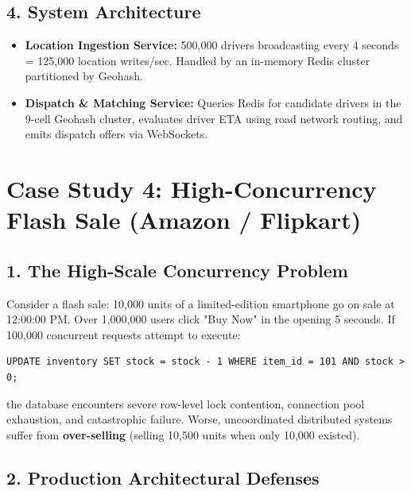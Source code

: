 \documentclass[10pt,journal,compsoc,onecolumn]{IEEEtran}
\begin{document}
\subsection{4. System Architecture}
\begin{itemize}
    \item \textbf{Location Ingestion Service:} 500,000 drivers broadcasting every 4 seconds = 125,000 location writes/sec. Handled by an in-memory Redis cluster partitioned by Geohash.
    \item \textbf{Dispatch \& Matching Service:} Queries Redis for candidate drivers in the 9-cell Geohash cluster, evaluates driver ETA using road network routing, and emits dispatch offers via WebSockets.
\end{itemize}

\section{Case Study 4: High-Concurrency Flash Sale (Amazon / Flipkart)}
\label{sec:flash_sale}

\subsection{1. The High-Scale Concurrency Problem}
Consider a flash sale: 10,000 units of a limited-edition smartphone go on sale at 12:00:00 PM. Over 1,000,000 users click "Buy Now" in the opening 5 seconds.
If 100,000 concurrent requests attempt to execute:
\begin{verbatim}
UPDATE inventory SET stock = stock - 1 WHERE item_id = 101 AND stock > 0;
\end{verbatim}
the database encounters severe row-level lock contention, connection pool exhaustion, and catastrophic failure. Worse, uncoordinated distributed systems suffer from \textbf{over-selling} (selling 10,500 units when only 10,000 existed).

\subsection{2. Production Architectural Defenses}
\end{document}
